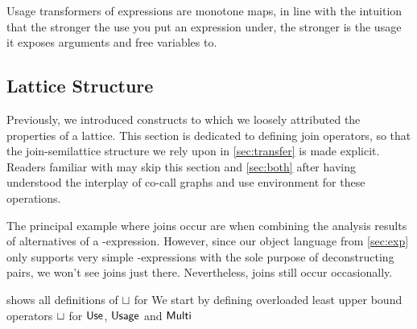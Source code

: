 Usage transformers of expressions are monotone maps, in line with the intuition that the stronger the use you put an expression under, the stronger is the usage it exposes arguments and free variables to.

\subsection{Lattice Structure}

Previously, we introduced constructs to which we loosely attributed the properties of a lattice. 
This section is dedicated to defining join operators, so that the join-semilattice structure we rely upon in \cref{sec:transfer} is made explicit.
Readers familiar with \textcite{card} may skip this section and \cref{sec:both} after having understood the interplay of co-call graphs and use environment for these operations.

The principal example where joins occur are when combining the analysis results of alternatives of a -expression. However, since our object language from \cref{sec:exp} only supports very simple -expressions with the sole purpose of deconstructing pairs, we won't see joins just there. Nevertheless, joins still occur occasionally.

 shows all definitions of $\sqcup$ for We start by defining overloaded least upper bound operators $\sqcup$ for $\text{\textsf{Use}}$, $\text{\textsf{Usage}}$ and $\text{\textsf{Multi}}$

